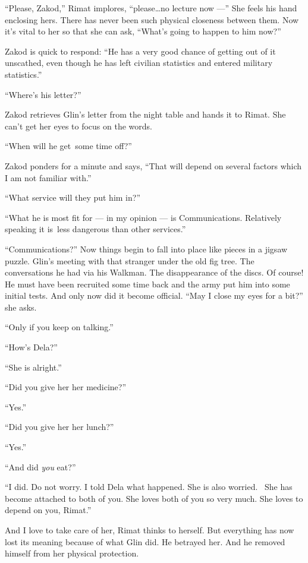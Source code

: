 \documentclass[twoside,11pt]{book}
\begin{document}
``Please, Zakod,'' Rimat implores, ``please{\ldots}no lecture now ---'' She feels his hand enclosing hers. There has
never been such physical closeness between them. Now it's vital to her so that she can ask,
``What's going to happen to him now?''

Zakod is quick to respond: ``He has a very good chance of getting out of it unscathed, even though he has
left civilian statistics and entered military statistics.''

``Where's his letter?''

Zakod retrieves Glin's letter from the night table and hands it to Rimat. She can't get her eyes to focus on the
words.

 ``When will he get~some time off?''

Zakod ponders for a minute and says, ``That will depend on several factors which I am not familiar with.''

{}``What service will they put him in?{}''

{}``What he is most fit for --- in my opinion --- is Communications. Relatively speaking it is~less dangerous than other
services.''

{}``Communications?'' Now things begin to fall into place like pieces in a jigsaw puzzle. Glin's meeting with that
stranger under the old fig tree. The conversations he had via his Walkman. The disappearance of the discs. Of course!
He must have been recruited some time back and the army put him into some initial tests. And only now did it become
official. ``May I close my eyes for a bit?'' she asks.

{}``Only if you keep on talking.''

``How's Dela?''

{}``She is alright.''

{}``Did you give her her medicine?''

{}``Yes.''

{}``Did you give her{ }her lunch?''

{}``Yes.''

{}``And did \textit{you} eat?''

{}``I did. Do not worry. I told Dela what happened. She is also worried.~ She has become attached to both of you. She
loves both of you so very much. She loves to depend on you, Rimat.{}''

And I love to take care of her, Rimat thinks to herself. But everything has now lost its meaning because of what Glin
did. He betrayed her. And he removed himself from her physical protection.
\end{document}
